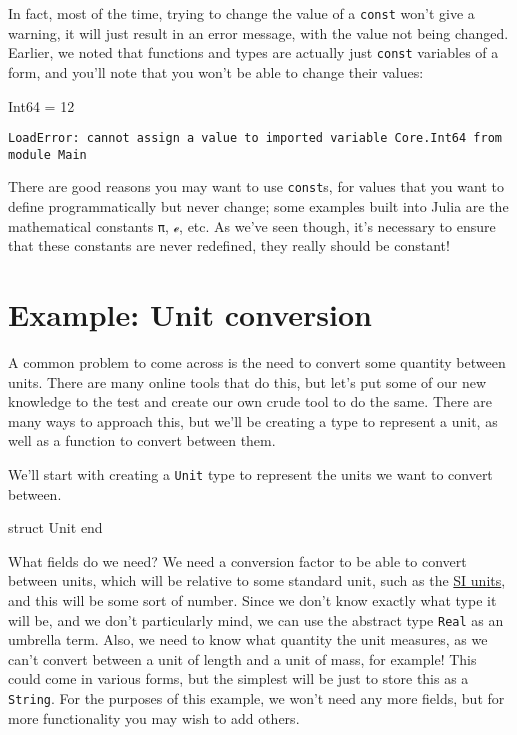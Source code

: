 \documentclass[
  letterpaper,
  DIV=11,
  numbers=noendperiod]{scrreprt}
\newenvironment{Shaded}{\begin{snugshade}}{\end{snugshade}}
\newcommand{\DataTypeTok}[1]{\textcolor[rgb]{0.68,0.00,0.00}{#1}}
\newcommand{\FloatTok}[1]{\textcolor[rgb]{0.68,0.00,0.00}{#1}}
\newcommand{\KeywordTok}[1]{\textcolor[rgb]{0.00,0.23,0.31}{#1}}
\newcommand{\NormalTok}[1]{\textcolor[rgb]{0.00,0.23,0.31}{#1}}
\newcommand{\OperatorTok}[1]{\textcolor[rgb]{0.37,0.37,0.37}{#1}}
\begin{document}
In fact, most of the time, trying to change the value of a
\texttt{const} won't give a warning, it will just result in an error
message, with the value not being changed. Earlier, we noted that
functions and types are actually just \texttt{const} variables of a
form, and you'll note that you won't be able to change their values:

\begin{Shaded}
\begin{Highlighting}[]
\DataTypeTok{Int64} \OperatorTok{=} \FloatTok{12}
\end{Highlighting}
\end{Shaded}

\begin{verbatim}
LoadError: cannot assign a value to imported variable Core.Int64 from module Main
\end{verbatim}

There are good reasons you may want to use \texttt{const}s, for values
that you want to define programmatically but never change; some examples
built into Julia are the mathematical constants \texttt{π}, \texttt{ℯ},
etc. As we've seen though, it's necessary to ensure that these constants
are never redefined, they really should be constant!

\hypertarget{example-unit-conversion}{%
\section{Example: Unit conversion}\label{example-unit-conversion}}

A common problem to come across is the need to convert some quantity
between units. There are many online tools that do this, but let's put
some of our new knowledge to the test and create our own crude tool to
do the same. There are many ways to approach this, but we'll be creating
a type to represent a unit, as well as a function to convert between
them.

We'll start with creating a \texttt{Unit} type to represent the units we
want to convert between.

\begin{Shaded}
\begin{Highlighting}[]
\KeywordTok{struct}\NormalTok{ Unit}
\KeywordTok{end}
\end{Highlighting}
\end{Shaded}

What fields do we need? We need a conversion factor to be able to
convert between units, which will be relative to some standard unit,
such as the
\href{https://en.wikipedia.org/wiki/International_System_of_Units}{SI
units}, and this will be some sort of number. Since we don't know
exactly what type it will be, and we don't particularly mind, we can use
the abstract type \texttt{Real} as an umbrella term. Also, we need to
know what quantity the unit measures, as we can't convert between a unit
of length and a unit of mass, for example! This could come in various
forms, but the simplest will be just to store this as a \texttt{String}.
For the purposes of this example, we won't need any more fields, but for
more functionality you may wish to add others.
\end{document}

